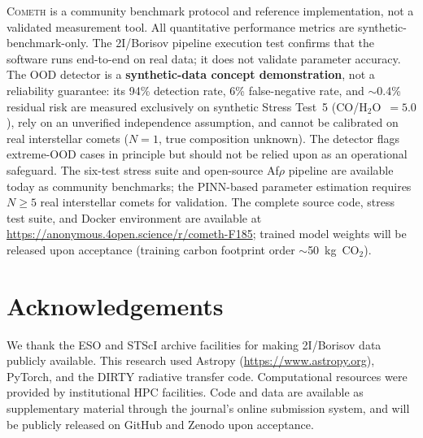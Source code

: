 \documentclass[usenatbib]{mnras}
\begin{document}
\textsc{Cometh} is a community benchmark protocol and reference implementation, not a validated measurement tool. All quantitative performance metrics are synthetic-benchmark-only. The 2I/Borisov pipeline execution test confirms that the software runs end-to-end on real data; it does not validate parameter accuracy. The OOD detector is a \textbf{synthetic-data concept demonstration}, not a reliability guarantee: its 94\% detection rate, 6\% false-negative rate, and $\sim$0.4\% residual risk are measured exclusively on synthetic Stress Test~5 (CO/H$_2$O~$=5.0$), rely on an unverified independence assumption, and cannot be calibrated on real interstellar comets ($N=1$, true composition unknown). The detector flags extreme-OOD cases in principle but should not be relied upon as an operational safeguard. The six-test stress suite and open-source Af$\rho$ pipeline are available today as community benchmarks; the PINN-based parameter estimation requires $N \geq 5$ real interstellar comets for validation. The complete source code, stress test suite, and Docker environment are available at \url{https://anonymous.4open.science/r/cometh-F185}; trained model weights will be released upon acceptance (training carbon footprint order $\sim$50~kg~CO$_2$).

\section*{Acknowledgements}
We thank the ESO and STScI archive facilities for making 2I/Borisov data publicly available. This research used Astropy (\url{https://www.astropy.org}), PyTorch, and the DIRTY radiative transfer code. Computational resources were provided by institutional HPC facilities. Code and data are available as supplementary material through the journal's online submission system, and will be publicly released on GitHub and Zenodo upon acceptance.
\end{document}
